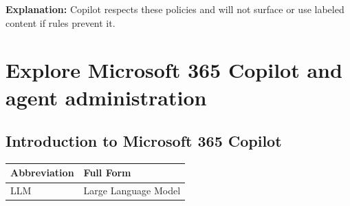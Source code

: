 \documentclass[10pt]{article}
\begin{document}
\begin{enumerate}[leftmargin=*]
\textbf{Explanation:} Copilot respects these policies and will not surface or use labeled content if rules prevent it.

\end{enumerate}
\clearpage

\section{Explore Microsoft 365 Copilot and agent administration}
\clearpage

\subsection{Introduction to Microsoft 365 Copilot}

\begin{center}
\begin{tabular}{>{\raggedright\arraybackslash}p{} >{\raggedright\arraybackslash}p{}}
\toprule
\textbf{Abbreviation} & \textbf{Full Form} \\
\midrule
LLM & Large Language Model \\
\end{tabular}
\end{center}
\end{document}
